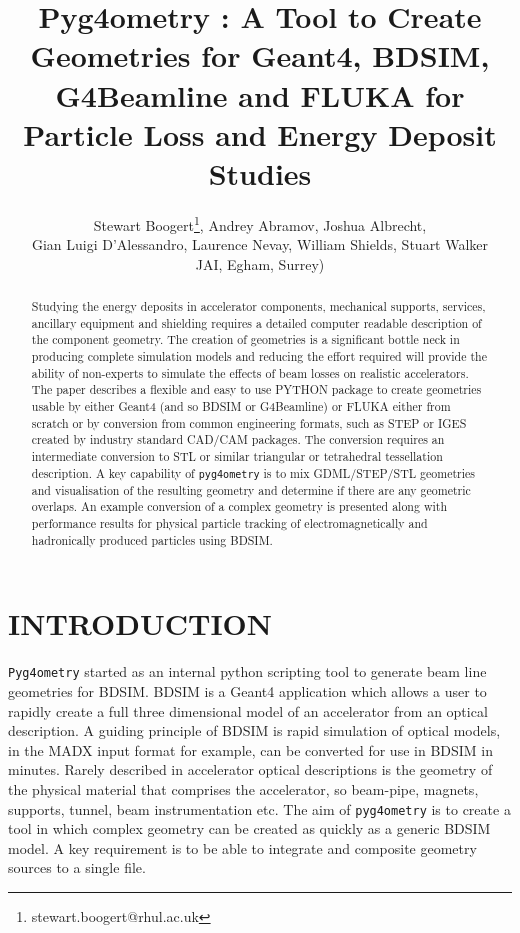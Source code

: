 \documentclass[a4paper,
               keeplastbox,   %
               ]{jacow}
\begin{document}
\title{Pyg4ometry : A Tool to Create Geometries for Geant4, BDSIM, G4Beamline and FLUKA for Particle Loss and Energy Deposit Studies}

\author{Stewart Boogert\thanks{stewart.boogert@rhul.ac.uk}, Andrey Abramov, Joshua Albrecht, \\ Gian Luigi D'Alessandro, Laurence Nevay, William Shields, Stuart Walker \\
JAI, Egham, Surrey)}
	
\maketitle

%
\begin{abstract}
Studying the energy deposits in accelerator components, mechanical supports, services, ancillary equipment and shielding requires a detailed computer readable description of the component geometry. The creation of geometries is a significant bottle neck in producing complete simulation models and reducing the effort required will provide the ability of non-experts to simulate the effects of beam losses on realistic accelerators. The paper describes a flexible and easy to use PYTHON package to create geometries usable by either Geant4 (and so BDSIM or G4Beamline) or FLUKA either from scratch or by conversion from common engineering formats, such as STEP or IGES created by industry standard CAD/CAM packages. The conversion requires an intermediate conversion to STL or similar triangular or tetrahedral tessellation description. A key capability of \verb|pyg4ometry| is to mix GDML/STEP/STL geometries and visualisation of the resulting geometry and determine if there are any geometric overlaps. An example conversion of a complex geometry is presented along with performance results for physical particle tracking of electromagnetically and hadronically produced particles using BDSIM.
\end{abstract}


\section{INTRODUCTION}
\verb|Pyg4ometry| started as an internal python scripting tool to generate beam line geometries for BDSIM. BDSIM is a Geant4 application which allows a user to rapidly create a full three dimensional model of an accelerator from an optical description. A guiding principle of BDSIM is rapid simulation of optical models, in the MADX input format for example, can be converted for use in BDSIM in minutes. Rarely described in accelerator optical descriptions is the geometry of the physical material that comprises the accelerator, so beam-pipe, magnets, supports, tunnel, beam instrumentation etc. The aim of \verb|pyg4ometry| is to create a tool  in which complex geometry can be created as quickly as a generic BDSIM model. A key requirement is to be able to integrate and composite geometry sources to a single file.             
\end{document}
